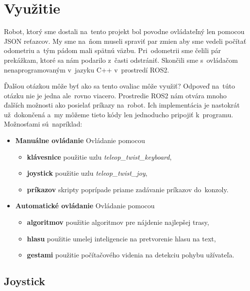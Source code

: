 
\section{Využitie}
\label{sec:vyuzitie}

Robot, ktorý sme dostali na~tento projekt bol povodne ovládateľný len pomocou JSON reťazcov. My sme na~ňom museli spraviť
par zmien aby sme vedeli počítať odometriu a~tým pádom mali spätnú väzbu. Pri~odometrii sme čelili pár prekážkam, ktoré
sa nám podarilo z~časti odstrániť. Skončili sme s~ovládačom nenaprogramovaným v~jazyku C++ v~prostredí ROS2.

Ďalšou otázkou môže byť ako sa tento ovaliac môže využiť? Odpoveď na~túto otázku nie je jedna ale~rovno viacero.
Prostredie ROS2 nám otvára mnoho ďalších možnosti ako posielať príkazy na~robot. Ich implementácia je nastokrát
už~dokončená a~my môžeme tieto kódy len jednoducho pripojiť k~programu. Možnosťami sú~napríklad:

\begin{itemize}
	\item \textbf{Manuálne ovládanie} Ovládanie pomocou
		\begin{itemize}
			\item \textbf{klávesnice} použitie uzlu \textit{teleop\_twist\_keyboard},
			\item \textbf{joystick} použitie uzlu \textit{teleop\_twist\_joy},
			\item \textbf{príkazov} skripty poprípade priame zadávanie príkazov do~konzoly.
		\end{itemize}
	\item \textbf{Automatické ovládanie} Ovládanie pomocou
		\begin{itemize}
			\item \textbf{algoritmov} použitie algoritmov pre nájdenie najlepšej trasy,
			\item \textbf{hlasu} použitie umelej inteligencie na pretvorenie hlasu na text,
			\item \textbf{gestami} použitie počítačového videnia na detekciu pohybu užívateľa.
		\end{itemize}
\end{itemize}

\subsection{Joystick}
\label{subsec:joystick}

